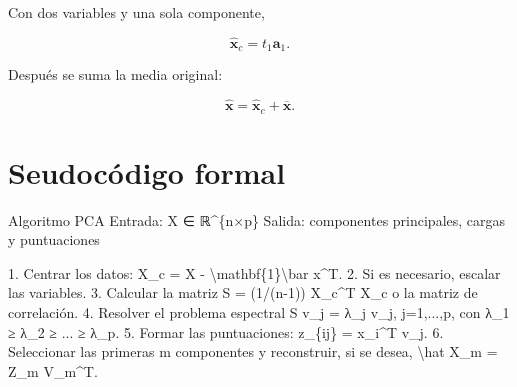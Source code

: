 \documentclass[
  spanish,
  10.5pt,
  letterpaper,
  DIV=11,
  numbers=noendperiod,
  oneside,
  open=any]{scrreprt}
\newenvironment{Shaded}{\begin{snugshade}}{\end{snugshade}}
\newcommand{\NormalTok}[1]{\textcolor[rgb]{0.00,0.23,0.31}{#1}}
\theoremstyle{definition}
\theoremstyle{definition}
\theoremstyle{plain}
\theoremstyle{remark}
\begin{document}

Con dos variables y una sola componente,

\[
\widehat{\mathbf{x}}_c
=
t_1\mathbf{a}_1.
\]

Después se suma la media original:

\[
\widehat{\mathbf{x}}
=
\widehat{\mathbf{x}}_c
+
\overline{\mathbf{x}}.
\]

\section*{Seudocódigo formal}\label{seudocuxf3digo-formal-8}


\begin{tcolorbox}[enhanced jigsaw, arc=.35mm, bottomrule=.15mm, bottomtitle=1mm, breakable, colback=white, colbacktitle=quarto-callout-note-color!10!white, colframe=quarto-callout-note-color-frame, coltitle=black, left=2mm, leftrule=.75mm, opacityback=0, opacitybacktitle=0.6, rightrule=.15mm, title=\textcolor{quarto-callout-note-color}{\faInfo}\hspace{0.5em}{Seudocódigo matemático formal}, titlerule=0mm, toprule=.15mm, toptitle=1mm]

\begin{Shaded}
\begin{Highlighting}[numbers=left,,]
\NormalTok{Algoritmo PCA}
\NormalTok{Entrada:}
\NormalTok{  X ∈ ℝ\^{}\{n×p\}}
\NormalTok{Salida:}
\NormalTok{  componentes principales, cargas y puntuaciones}

\NormalTok{1. Centrar los datos:}
\NormalTok{      X\_c = X {-} \textbackslash{}mathbf\{1\}\textbackslash{}bar x\^{}T.}
\NormalTok{2. Si es necesario, escalar las variables.}
\NormalTok{3. Calcular la matriz}
\NormalTok{      S = (1/(n{-}1)) X\_c\^{}T X\_c}
\NormalTok{   o la matriz de correlación.}
\NormalTok{4. Resolver el problema espectral}
\NormalTok{      S v\_j = λ\_j v\_j,   j=1,...,p,}
\NormalTok{   con λ\_1 ≥ λ\_2 ≥ ... ≥ λ\_p.}
\NormalTok{5. Formar las puntuaciones:}
\NormalTok{      z\_\{ij\} = x\_i\^{}T v\_j.}
\NormalTok{6. Seleccionar las primeras m componentes y reconstruir, si se desea,}
\NormalTok{      \textbackslash{}hat X\_m = Z\_m V\_m\^{}T.}
\end{Highlighting}
\end{Shaded}

\end{tcolorbox}
\end{document}
